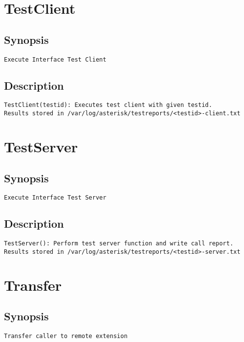 \section{TestClient}
\subsection{Synopsis}
\begin{verbatim}
Execute Interface Test Client
\end{verbatim}
\subsection{Description}
\begin{verbatim}
TestClient(testid): Executes test client with given testid.
Results stored in /var/log/asterisk/testreports/<testid>-client.txt
\end{verbatim}


\section{TestServer}
\subsection{Synopsis}
\begin{verbatim}
Execute Interface Test Server
\end{verbatim}
\subsection{Description}
\begin{verbatim}
TestServer(): Perform test server function and write call report.
Results stored in /var/log/asterisk/testreports/<testid>-server.txt
\end{verbatim}


\section{Transfer}
\subsection{Synopsis}
\begin{verbatim}
Transfer caller to remote extension
\end{verbatim}
